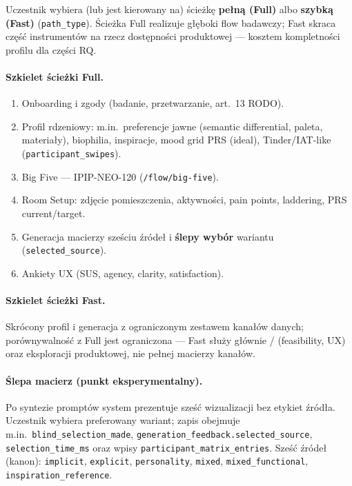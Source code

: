 Uczestnik wybiera (lub jest kierowany na) ścieżkę \textbf{pełną (Full)} albo \textbf{szybką (Fast)} (\texttt{path\_type}). Ścieżka Full realizuje głęboki flow badawczy; Fast skraca część instrumentów na rzecz dostępności produktowej --- kosztem kompletności profilu dla części RQ.

\paragraph{Szkielet ścieżki Full.}
\begin{enumerate}
  \item Onboarding i zgody (badanie, przetwarzanie, art.~13 RODO).
  \item Profil rdzeniowy: m.in.\ preferencje jawne (semantic differential, paleta, materiały), biophilia, inspiracje, mood grid PRS (ideal), Tinder/IAT-like (\texttt{participant\_swipes}).
  \item Big Five --- IPIP-NEO-120 (\texttt{/flow/big-five}).
  \item Room Setup: zdjęcie pomieszczenia, aktywności, pain points, laddering, PRS current/target.
  \item Generacja macierzy sześciu źródeł i \textbf{ślepy wybór} wariantu (\texttt{selected\_source}).
  \item Ankiety UX (SUS, agency, clarity, satisfaction).
\end{enumerate}

\paragraph{Szkielet ścieżki Fast.}
Skrócony profil i generacja z ograniczonym zestawem kanałów danych; porównywalność z Full jest ograniczona --- Fast służy głównie / (feasibility, UX) oraz eksploracji produktowej, nie pełnej macierzy kanałów.

\paragraph{Ślepa macierz (punkt eksperymentalny).}
Po syntezie promptów system prezentuje sześć wizualizacji bez etykiet źródła. Uczestnik wybiera preferowany wariant; zapis obejmuje m.in.\ \texttt{blind\_selection\_made}, \texttt{generation\_feedback.selected\_source}, \texttt{selection\_time\_ms} oraz wpisy \texttt{participant\_matrix\_entries}. Sześć źródeł (kanon): \texttt{implicit}, \texttt{explicit}, \texttt{personality}, \texttt{mixed}, \texttt{mixed\_functional}, \texttt{inspiration\_reference}.

